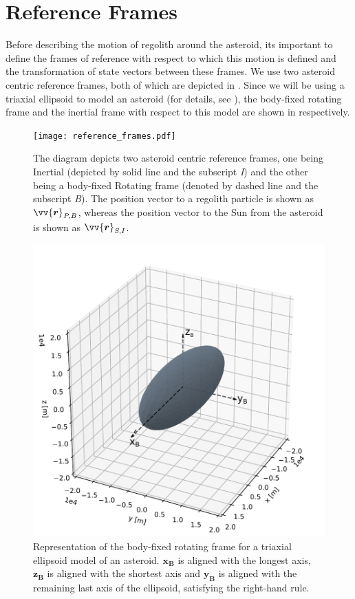 \section{Reference Frames}
\label{sec:reference_frames}
Before describing the motion of regolith around the asteroid, its important to define the frames of reference with respect to which this motion is defined and the transformation of state vectors between these frames. We use two asteroid centric reference frames, both of which are depicted in . Since we will be using a triaxial ellipsoid to model an asteroid (for details, see ), the body-fixed rotating frame and the inertial frame with respect to this model are shown in  respectively.
\begin{figure}[htb]
\centering
\captionsetup{justification=centering}
\texttt{[image: reference\_frames.pdf]}
\caption{The diagram depicts two asteroid centric reference frames, one being Inertial (depicted by solid line and the subscript \emph{I}) and the other being a body-fixed Rotating frame (denoted by dashed line and the subscript \emph{B}). The position vector to a regolith particle is shown as $\protect\vv{\bm{r}}_{P,B}$, whereas the position vector to the Sun from the asteroid is shown as $\protect\vv{\bm{r}}_{S,I}$.}
\label{fig:reference_frame}
\end{figure}
\FloatBarrier
\begin{figure}[htb]
\centering
\captionsetup{justification=centering}
\includegraphics[width=\textwidth, height=0.35\textheight, keepaspectratio=true]{body_fixed_ellipsoid_frame.pdf}
\caption{Representation of the body-fixed rotating frame for a triaxial ellipsoid model of an asteroid. $\bm{x_{B}}$ is aligned with the longest axis, $\bm{z_{B}}$ is aligned with the shortest axis and $\bm{y_{B}}$ is aligned with the remaining last axis of the ellipsoid, satisfying the right-hand rule.}
\label{fig:ellipsoid_rotating_frame}
\end{figure}

